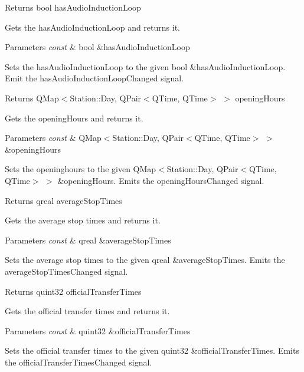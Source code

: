 \begin{DoxyReturn}{Returns}
bool has\+Audio\+Induction\+Loop
\end{DoxyReturn}
Gets the has\+Audio\+Induction\+Loop and returns it.


\begin{DoxyParams}{Parameters}
{\em const} & bool \&has\+Audio\+Induction\+Loop\\
\hline
\end{DoxyParams}
Sets the has\+Audio\+Induction\+Loop to the given bool \&has\+Audio\+Induction\+Loop. Emit the has\+Audio\+Induction\+Loop\+Changed signal.

\begin{DoxyReturn}{Returns}
Q\+Map$<$Station\+::\+Day, Q\+Pair$<$\+Q\+Time, Q\+Time$>$ $>$ opening\+Hours
\end{DoxyReturn}
Gets the opening\+Hours and returns it.


\begin{DoxyParams}{Parameters}
{\em const} & Q\+Map$<$Station\+::\+Day, Q\+Pair$<$\+Q\+Time, Q\+Time$>$ $>$ \&opening\+Hours\\
\hline
\end{DoxyParams}
Sets the openinghours to the given Q\+Map$<$Station\+::\+Day, Q\+Pair$<$\+Q\+Time, Q\+Time$>$ $>$ \&opening\+Hours. Emits the opening\+Hours\+Changed signal.

\begin{DoxyReturn}{Returns}
qreal average\+Stop\+Times
\end{DoxyReturn}
Gets the average stop times and returns it.


\begin{DoxyParams}{Parameters}
{\em const} & qreal \&average\+Stop\+Times\\
\hline
\end{DoxyParams}
Sets the average stop times to the given qreal \&average\+Stop\+Times. Emits the average\+Stop\+Times\+Changed signal.

\begin{DoxyReturn}{Returns}
quint32 official\+Transfer\+Times
\end{DoxyReturn}
Gets the official transfer times and returns it.


\begin{DoxyParams}{Parameters}
{\em const} & quint32 \&official\+Transfer\+Times\\
\hline
\end{DoxyParams}
Sets the official transfer times to the given quint32 \&official\+Transfer\+Times. Emits the official\+Transfer\+Times\+Changed signal.

